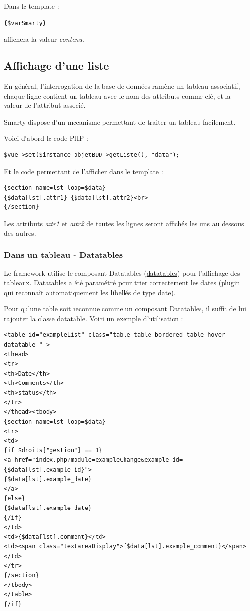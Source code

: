 Dans le template :
\begin{lstlisting}
{$varSmarty}
\end{lstlisting}
affichera la valeur \textit{contenu}.


\subsection{Affichage d'une liste}
En général, l'interrogation de la base de données ramène un tableau associatif, chaque ligne contient un tableau avec le nom des attributs comme clé, et la valeur de l'attribut associé.

Smarty dispose d'un mécanisme permettant de traiter un tableau facilement.

Voici d'abord le code PHP :
\begin{lstlisting} 
$vue->set($instance_objetBDD->getListe(), "data");
\end{lstlisting}

Et le code permettant de l'afficher dans le template :
\begin{lstlisting}
{section name=lst loop=$data}
{$data[lst].attr1} {$data[lst].attr2}<br>
{/section}
\end{lstlisting}

Les attributs \textit{attr1} et \textit{attr2} de toutes les lignes seront affichés les uns au dessous des autres.

\subsubsection{Dans un tableau - Datatables}

Le framework utilise le composant Datatables (\url{datatables}) pour l'affichage des tableaux. Datatables a été paramétré pour trier correctement les dates (plugin qui reconnaît automatiquement les libellés de type date).

Pour qu'une table soit reconnue comme un composant Datatables, il suffit de lui rajouter la classe datatable. Voici un exemple d'utilisation :
\begin{lstlisting}
<table id="exampleList" class="table table-bordered table-hover datatable " >
<thead>
<tr>
<th>Date</th>
<th>Comments</th>
<th>status</th>
</tr>
</thead><tbody>
{section name=lst loop=$data}
<tr>
<td>
{if $droits["gestion"] == 1}
<a href="index.php?module=exampleChange&example_id={$data[lst].example_id}">
{$data[lst].example_date}
</a>
{else}
{$data[lst].example_date}
{/if}
</td>
<td>{$data[lst].comment}</td>
<td><span class="textareaDisplay">{$data[lst].example_comment}</span></td>
</tr>
{/section}
</tbody>
</table>
{/if}
\end{lstlisting}


